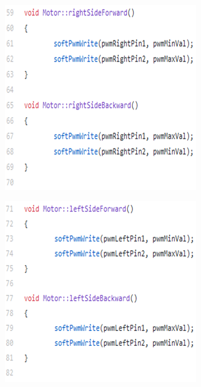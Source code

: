\documentclass{article}
\begin{document}
\begin{figure}[h]
\centering
\begin{minipage}{.5\textwidth}
  \centering
  \includegraphics[width=1\linewidth]{figures/63.png}
  \label{fig:test1}
\end{minipage}%
\begin{minipage}{.5\textwidth}
  \centering
  \includegraphics[width=1\linewidth]{figures/64.png}
  \label{fig:test2}
\end{minipage}
\end{figure}
\end{document}
